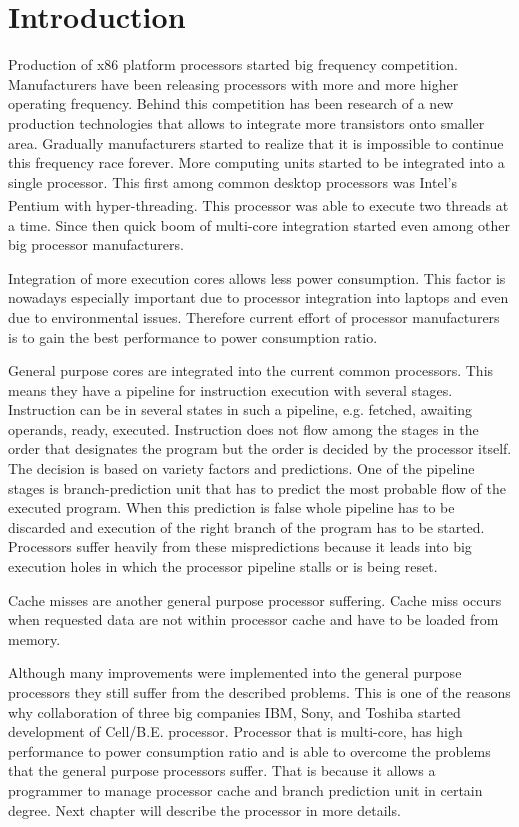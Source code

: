 \chapter{Introduction}

Production of x86 platform processors started big frequency competition.
Manufacturers have been releasing processors with more and more higher operating frequency.
Behind this competition has been research of a new production technologies that allows to integrate more transistors onto smaller area.
Gradually manufacturers started to realize that it is impossible to continue this frequency race forever.
More computing units started to be integrated into a single processor.
This first among common desktop processors was Intel's Pentium\textsuperscript{\textregistered} with hyper-threading.
This processor was able to execute two threads at a time.
Since then quick boom of multi-core integration started even among other big processor manufacturers.
\par
Integration of more execution cores allows less power consumption.
This factor is nowadays especially important due to processor integration into laptops and even due to environmental issues.
Therefore current effort of processor manufacturers is to gain the best performance to power consumption ratio.

General purpose cores are integrated into the current common processors.
This means they have a pipeline for instruction execution with several stages.
Instruction can be in several states in such a pipeline, e.g. fetched, awaiting operands, ready, executed.
Instruction does not flow among the stages in the order that designates the program but the order is decided by the processor itself.
The decision is based on variety factors and predictions.
One of the pipeline stages is branch-prediction unit that has to predict the most probable flow of the executed program.
When this prediction is false whole pipeline has to be discarded and execution of the right branch of the program has to be started.
Processors suffer heavily from these mispredictions because it leads into big execution holes in which the processor pipeline stalls or is being reset.

Cache misses are another general purpose processor suffering.
Cache miss occurs when requested data are not within processor cache and have to be loaded from memory.

Although many improvements were implemented into the general purpose processors they still suffer from the described problems.
This is one of the reasons why collaboration of three big companies IBM, Sony, and Toshiba started development of Cell/B.E. processor.
Processor that is multi-core, has high performance to power consumption ratio and is able to overcome the problems that the general purpose processors suffer.
That is because it allows a programmer to manage processor cache and branch prediction unit in certain degree.
Next chapter will describe the processor in more details.

